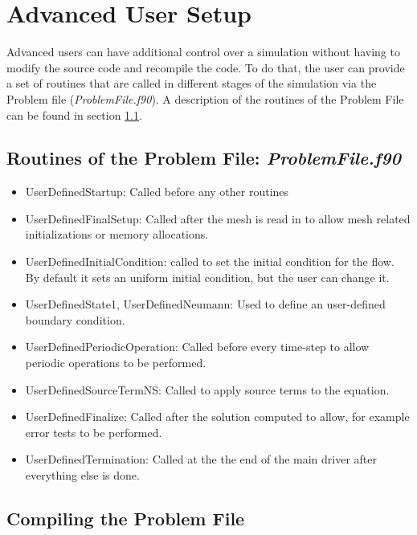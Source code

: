 \documentclass[a4paper,10pt]{report}
\begin{document}
\chapter{Advanced User Setup}

Advanced users can have additional control over a simulation without having to modify the source code and recompile the code. To do that, the user can provide a set of routines that are called in different stages of the simulation via the Problem file (\textit{ProblemFile.f90}). A description of the routines of the Problem File can be found in section \ref{sec:ProblemFile}.

\section{Routines of the Problem File: \textit{ProblemFile.f90}} \label{sec:ProblemFile}

\begin{itemize}
\item UserDefinedStartup: Called before any other routines

\item UserDefinedFinalSetup: Called after the mesh is read in to allow mesh related initializations or memory allocations.

\item UserDefinedInitialCondition: called to set the initial condition for the flow. By default it sets an uniform initial condition, but the user can change it.

\item UserDefinedState1, UserDefinedNeumann: Used to define an user-defined boundary condition.

\item UserDefinedPeriodicOperation: Called before every time-step to allow periodic operations to be performed.

\item UserDefinedSourceTermNS: Called to apply source terms to the equation.

\item UserDefinedFinalize: Called after the solution computed to allow, for example error tests to be performed.

\item UserDefinedTermination: Called at the the end of the main driver after everything else is done.
\end{itemize}

\section{Compiling the Problem File}
\end{document}
